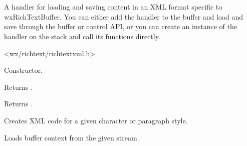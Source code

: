 \section{}\label{wxrichtextxmlhandler}

A handler for loading and saving content in an XML format specific
to wxRichTextBuffer. You can either add the handler to the buffer
and load and save through the buffer or control API, or you can
create an instance of the handler on the stack and call its
functions directly.




<wx/richtext/richtextxml.h>



\label{wxrichtextxmlhandlerwxrichtextxmlhandler}


Constructor.

\label{wxrichtextxmlhandlercanload}


Returns \true.

\label{wxrichtextxmlhandlercansave}


Returns \true.

\label{wxrichtextxmlhandlercreatestyle}


Creates XML code for a given character or paragraph style.

\label{wxrichtextxmlhandlerdoloadfile}


Loads buffer context from the given stream.

